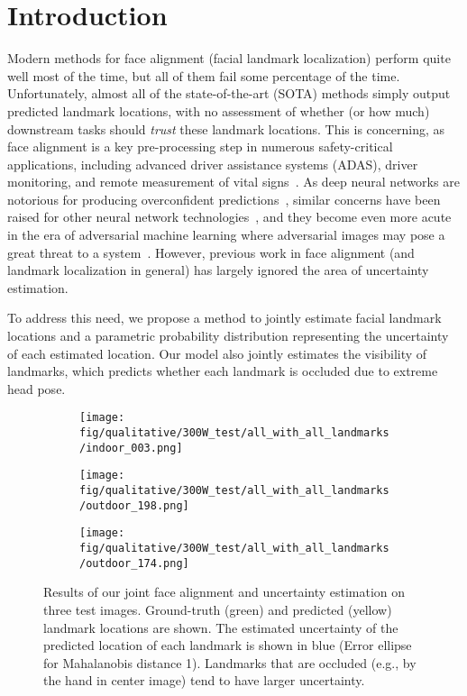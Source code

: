 \documentclass[10pt,twocolumn,letterpaper]{article}
\newcommand{\example}{{e.g.}}
\newcommand{\1}{{\bf 1}}
\newcommand{\0}{{\bf 0}}
\begin{document}
\vspace{-0.5cm}
\section{Introduction}
    Modern methods for face alignment (facial landmark localization) perform quite well most of the time, but all of them fail some percentage of the time. Unfortunately, almost all of the state-of-the-art (SOTA) methods simply output predicted landmark locations, with no assessment of whether (or how much) downstream tasks should {\it trust} these landmark locations. This is concerning, as face alignment is a key pre-processing step in numerous safety-critical applications, including advanced driver assistance systems (ADAS), driver monitoring, and remote measurement of vital signs~\cite{nowara2018sparseppg}. As deep neural networks are notorious for producing overconfident predictions~\cite{guo2017calibration}, similar concerns have been raised for other neural network technologies~\cite{le2018uncertainty}, and they become even more acute in the era of adversarial machine learning where adversarial images may pose a great threat to a system~\cite{chen2019face}. However, previous work in face alignment (and landmark localization in general) has largely ignored the area of uncertainty estimation.
    
    To address this need, we propose a method to jointly estimate facial landmark locations and a parametric probability distribution representing the uncertainty of each estimated location. Our model also jointly estimates the visibility of landmarks, which predicts whether each landmark is occluded due to extreme head pose.

    \begin{figure}[!tb]
    	\centering
    	\begin{subfigure}{0.3\linewidth}
    		\texttt{[image: fig/qualitative/300W\_test/all\_with\_all\_landmarks/indoor\_003.png]}
    	\end{subfigure}
    	\hfill
    	\begin{subfigure}{0.3\linewidth}
    		\texttt{[image: fig/qualitative/300W\_test/all\_with\_all\_landmarks/outdoor\_198.png]}
    	\end{subfigure}\hfill
    	\begin{subfigure}{0.3\linewidth}
    		\texttt{[image: fig/qualitative/300W\_test/all\_with\_all\_landmarks/outdoor\_174.png]}
    	\end{subfigure}\caption{Results of our joint face alignment and uncertainty estimation on three test images. Ground-truth (green) and predicted (yellow) landmark locations are shown. The estimated uncertainty of the predicted location of each landmark is shown in blue (Error ellipse for Mahalanobis distance 1). Landmarks that are occluded (\example, by the hand in center image) tend to have larger uncertainty. 
    	}
    	\vspace{-0.25cm}
    	\label{fig:fig1}
    \end{figure}
    
\end{document}
